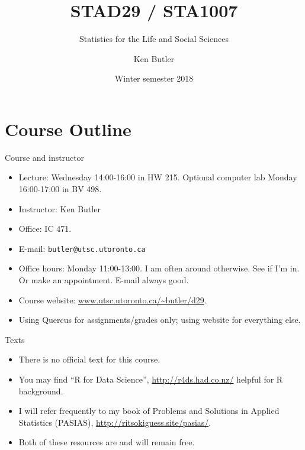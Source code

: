 \documentclass[unknownkeysallowed]{beamer}\usepackage[]{graphicx}\usepackage[]{color}
\title[Course Slides] %
{STAD29 / STA1007}
\subtitle
{Statistics for the Life and Social Sciences}
\author %
{Ken Butler}
\date[Winter 2018] %
{Winter semester 2018}
\begin{document}


\begin{frame}
  \titlepage
\end{frame}

%


\section*{Course Outline}
\frame{\sectionpage}

\begin{frame}[fragile]{Course and instructor}
  \begin{itemize}
    \item  Lecture: Wednesday 14:00-16:00 in HW 215. Optional computer
      lab Monday 16:00-17:00 in BV 498.
    \item  Instructor: Ken Butler
    \item  Office: IC 471.
    \item  E-mail: \verb-butler@utsc.utoronto.ca-
    \item Office hours: Monday 11:00-13:00. I am often around
      otherwise. See if I'm in. Or make an appointment. E-mail always
      good.
    \item Course website: 
\url{www.utsc.utoronto.ca/~butler/d29}.
    \item Using Quercus for assignments/grades only; using website for
      everything else.
\end{itemize}

\end{frame}

\begin{frame}[fragile]{Texts}

\begin{itemize}
\item There is no official text for this course. 
\item You may find ``R for Data Science'', 
  \url{http://r4ds.had.co.nz/} helpful for R background.
\item I will refer frequently to my book of Problems and Solutions in Applied Statistics (PASIAS), \url{http://ritsokiguess.site/pasias/}.
\item Both of these resources are and will remain free.
\end{itemize}
  
\end{frame}
\end{document}
